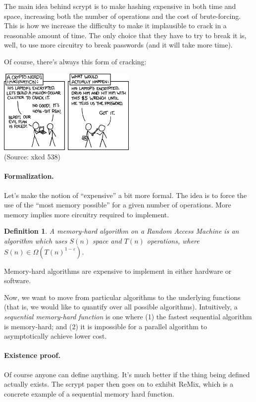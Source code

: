 The main idea behind scrypt is to make hashing expensive in both time and space,
increasing both the number of operations and the cost of brute-forcing. This is how we increase the difficulty to make it implausible to crack in a reasonable amount of time. The only choice that they have to try to break it is, well, to use more circuitry to break passwords (and it will take more time).

Of course, there's always this form of cracking:
\begin{center}
\includegraphics[width=0.5\textwidth]{images/xkcd-538}\\
\hfill (Source: xkcd 538)
\end{center}

\newtheorem{defn}{Definition}

\paragraph{Formalization.} Let's make the notion of ``expensive'' a bit more formal.
The idea is to force the use of the ``most memory possible'' for a given number of
operations. More memory implies more circuitry required to implement.

    \begin{defn}
      A \emph{memory-hard} algorithm on a Random Access Machine is an
      algorithm which uses $S(n)$ space and $T(n)$ operations, where
      $S(n) \in \Omega(T(n)^{1-\varepsilon})$.
    \end{defn}

Memory-hard algorithms are expensive to implement in either hardware or software.

Now, we want to move from particular algorithms to the underlying
functions (that is, we would like to quantify over all possible
algorithms). Intuitively, a \emph{sequential memory-hard function} is
one where (1) the fastest sequential algorithm is memory-hard; and (2)
it is impossible for a parallel algorithm to asymptotically achieve
lower cost.

\paragraph{Existence proof.} Of course anyone can define anything.
It's much better if the thing being defined actually exists. The
scrypt paper then goes on to exhibit ReMix, which is a concrete
example of a sequential memory hard function.

